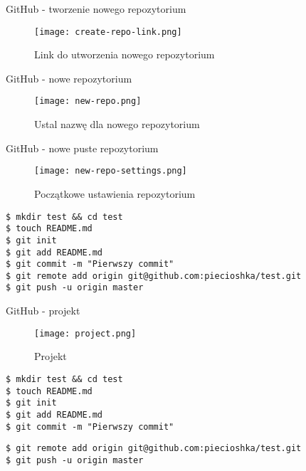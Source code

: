 \documentclass{beamer}
\begin{document}
\begin{frame}{GitHub - tworzenie nowego repozytorium}
	\begin{figure}
	\texttt{[image: create-repo-link.png]}
	\caption{\label{fig:create-repo-link}Link do utworzenia nowego repozytorium}
	\end{figure}
\end{frame}

\begin{frame}{GitHub - nowe repozytorium}
	\begin{figure}
	\texttt{[image: new-repo.png]}
	\caption{\label{fig:new-repo}Ustal nazwę dla nowego repozytorium}
	\end{figure}
\end{frame}

\begin{frame}{GitHub - nowe puste repozytorium}
	\begin{figure}
	\texttt{[image: new-repo-settings.png]}
	\caption{\label{fig:new-repo-settings}Początkowe ustawienia repozytorium}
	\end{figure}
\end{frame}

\begin{framed}
\begin{lstlisting}[frame=none, caption=Pierwszy projekt]
$ mkdir test && cd test
$ touch README.md
$ git init
$ git add README.md
$ git commit -m "Pierwszy commit"
$ git remote add origin git@github.com:piecioshka/test.git
$ git push -u origin master
\end{lstlisting}
\end{framed}

\begin{frame}{GitHub - projekt}
	\begin{figure}
	\texttt{[image: project.png]}
	\caption{\label{fig:project}Projekt}
	\end{figure}
\end{frame}

\begin{framed}
\begin{lstlisting}[frame=none, caption=Praca lokalna]
$ mkdir test && cd test
$ touch README.md
$ git init
$ git add README.md
$ git commit -m "Pierwszy commit"
\end{lstlisting}
\end{framed}

\begin{framed}
\begin{lstlisting}[frame=none, caption=Praca zdalna]
$ git remote add origin git@github.com:piecioshka/test.git
$ git push -u origin master
\end{lstlisting}
\end{framed}
\end{document}
